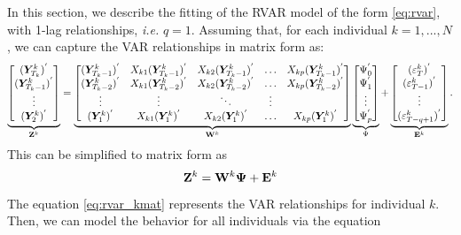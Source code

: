 In this section, we describe the fitting of the RVAR model of the form \eqref{eq:rvar}, with 1-lag relationships, \textit{i.e.} $q = 1$. Assuming that, for each individual $k=1,...,N$, we can capture the VAR relationships in matrix form as:
{\footnotesize
\begin{equation*}
	\underbrace{\begin{bmatrix} 
		(\bm{Y}_{T_k}^k)^{'} \\ (\bm{Y}_{T_k-1}^k)^{'} \\ \vdots \\ (\bm{Y}_{2}^k)^{'}
	\end{bmatrix}}_{\mathbf{Z}^{k}} = 
	\underbrace{\begin{bmatrix} 
		(\bm{Y}_{T_k-1}^{k})^{'}  & X_{k1} (\bm{Y}_{T_k-1}^{k})^{'} &  X_{k2} (\bm{Y}_{T_k-1}^{k})^{'} & \ldots & X_{kp} (\bm{Y}_{T_k-1}^{k})^{'} \\
		(\bm{Y}_{T_k-2}^{k})^{'}  & X_{k1} (\bm{Y}_{T_k-2}^{k})^{'} &  X_{k2} (\bm{Y}_{T_k-2}^{k})^{'} & \ldots & X_{kp} (\bm{Y}_{T_k-2}^{k})^{'} \\
		 \vdots      &     \vdots      & \ddots & \vdots 		  \\
		(\bm{Y}_{1}^{k})^{'}  & X_{k1} (\bm{Y}_{1}^{k})^{'} &  X_{k2} (\bm{Y}_{1}^{k})^{'} & \ldots & X_{kp} (\bm{Y}_{1}^{k})^{'} \\
	\end{bmatrix}}_{\mathbf{W}^k} 
	\underbrace{\begin{bmatrix}
		\Psi_{0}^{'} \\ \Psi_{1}^{'} \\ \vdots \\ \Psi_{p}^{'}
	\end{bmatrix}}_{\Psi} +  
	\underbrace{\begin{bmatrix} 
		(\varepsilon_T^{k})^{'} \\ (\varepsilon_{T-1}^{k})^{'} \\ \vdots \\ (\varepsilon_{T-q+1}^{k})^{'}
	\end{bmatrix}}_{\mathbf{E}^{k}}.
\end{equation*}
}%
This can be simplified to matrix form as
\begin{equation}\label{eq:rvar_kmat}
	\mathbf{Z}^{k} = \mathbf{W}^{k} \bm{\Psi} + \mathbf{E}^{k}
\end{equation}
The equation \eqref{eq:rvar_kmat} represents the VAR relationships for individual $k$. Then, we can model the behavior for all individuals via the equation
